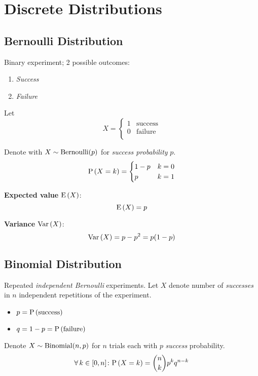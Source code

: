 \section*{Discrete Distributions}

\subsection*{Bernoulli Distribution}

Binary experiment; 2 possible outcomes:
\begin{enumerate}
    \item \textit{Success}
    \item \textit{Failure}
\end{enumerate}

Let
\begin{equation*}
    X = \begin{cases}
    1 & \text{success} \\
    0 & \text{failure} \\
    \end{cases}
\end{equation*}

Denote with $X \sim \mathrm{Bernoulli}(p)$ for \textit{success probability} $p$.
\begin{equation*}
    \mathrm{P} \left( X = k \right) = \begin{cases}
        1 - p & k = 0 \\
        p & k = 1 \\
    \end{cases}
\end{equation*}

\textbf{Expected value} $\mathrm{E} \left( X \right)$:
\begin{equation*}
    \mathrm{E} \left( X \right) = p
\end{equation*}

\textbf{Variance} $\mathrm{Var} \left( X \right)$:
\begin{equation*}
    \mathrm{Var} \left( X \right) = p - p^2 = p(1 - p)
\end{equation*}

\subsection*{Binomial Distribution}

Repeated \textit{independent Bernoulli} experiments. Let $X$ denote number of \textit{successes} in $n$ independent repetitions of the experiment.
\begin{itemize}
    \item $p = \mathrm{P} \left( \text{success} \right)$
    \item $q = 1 - p = \mathrm{P} \left( \text{failure} \right)$
\end{itemize}
Denote $X \sim \mathrm{Binomial}(n, p)$ for $n$ trials each with $p$ \textit{success} probability.
\begin{equation*}
    \operatorname{\forall} k \in [0, n] \colon 
    \mathrm{P} \left( X = k \right) = \binom{n}{k} p^k q^{n - k}
\end{equation*}

